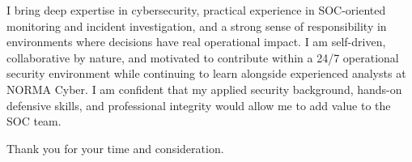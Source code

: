 I bring deep expertise in cybersecurity, practical experience in SOC-oriented monitoring and incident investigation, and a strong sense of responsibility in environments where decisions have real operational impact. I am self-driven, collaborative by nature, and motivated to contribute within a 24/7 operational security environment while continuing to learn alongside experienced analysts at NORMA Cyber. I am confident that my applied security background, hands-on defensive skills, and professional integrity would allow me to add value to the SOC team.

Thank you for your time and consideration.